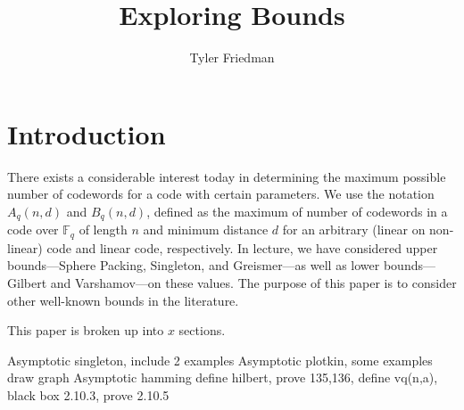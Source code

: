 \documentclass{article}
\title{Exploring Bounds}
\author{Tyler Friedman}
\begin{document}
\maketitle

\section{Introduction}

There exists a considerable interest today in determining the maximum possible
number of codewords for a code with certain parameters.  We use the notation $A_q(n,d)$
and $B_q(n,d)$, defined as the maximum of number of codewords in a code over
$\mathbb{F}_q$ of length $n$ and minimum distance $d$ for an arbitrary (linear
on non-linear) code and linear code, respectively.  In lecture, we have
considered upper bounds---Sphere Packing, Singleton, and Greismer---as well as
lower bounds---Gilbert and Varshamov---on these values.  The purpose of this
paper is to consider other well-known bounds in the literature.

This paper is broken up into $x$ sections.

Asymptotic singleton, include 2 examples
Asymptotic plotkin, some examples
draw graph
Asymptotic hamming
	define hilbert, prove 135,136, define vq(n,a),
	black box 2.10.3, prove 2.10.5
\end{document}
